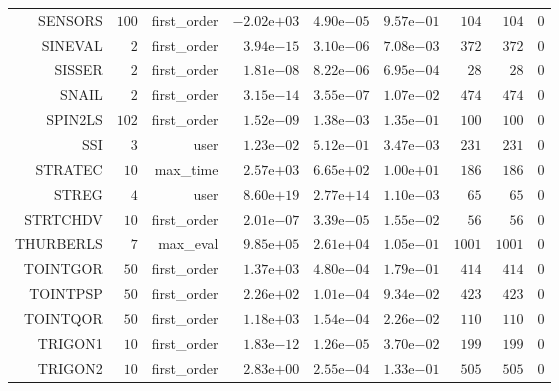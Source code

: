 \begin{longtable}{rrrrrrrrr}
SENSORS & \(   100\) & first\_order & \(-2.02\)e\(+03\) & \( 4.90\)e\(-05\) & \( 9.57\)e\(-01\) & \(   104\) & \(   104\) & \(     0\) \\
SINEVAL & \(     2\) & first\_order & \( 3.94\)e\(-15\) & \( 3.10\)e\(-06\) & \( 7.08\)e\(-03\) & \(   372\) & \(   372\) & \(     0\) \\
SISSER & \(     2\) & first\_order & \( 1.81\)e\(-08\) & \( 8.22\)e\(-06\) & \( 6.95\)e\(-04\) & \(    28\) & \(    28\) & \(     0\) \\
SNAIL & \(     2\) & first\_order & \( 3.15\)e\(-14\) & \( 3.55\)e\(-07\) & \( 1.07\)e\(-02\) & \(   474\) & \(   474\) & \(     0\) \\
SPIN2LS & \(   102\) & first\_order & \( 1.52\)e\(-09\) & \( 1.38\)e\(-03\) & \( 1.35\)e\(-01\) & \(   100\) & \(   100\) & \(     0\) \\
SSI & \(     3\) & user & \( 1.23\)e\(-02\) & \( 5.12\)e\(-01\) & \( 3.47\)e\(-03\) & \(   231\) & \(   231\) & \(     0\) \\
STRATEC & \(    10\) & max\_time & \( 2.57\)e\(+03\) & \( 6.65\)e\(+02\) & \( 1.00\)e\(+01\) & \(   186\) & \(   186\) & \(     0\) \\
STREG & \(     4\) & user & \( 8.60\)e\(+19\) & \( 2.77\)e\(+14\) & \( 1.10\)e\(-03\) & \(    65\) & \(    65\) & \(     0\) \\
STRTCHDV & \(    10\) & first\_order & \( 2.01\)e\(-07\) & \( 3.39\)e\(-05\) & \( 1.55\)e\(-02\) & \(    56\) & \(    56\) & \(     0\) \\
THURBERLS & \(     7\) & max\_eval & \( 9.85\)e\(+05\) & \( 2.61\)e\(+04\) & \( 1.05\)e\(-01\) & \(  1001\) & \(  1001\) & \(     0\) \\
TOINTGOR & \(    50\) & first\_order & \( 1.37\)e\(+03\) & \( 4.80\)e\(-04\) & \( 1.79\)e\(-01\) & \(   414\) & \(   414\) & \(     0\) \\
TOINTPSP & \(    50\) & first\_order & \( 2.26\)e\(+02\) & \( 1.01\)e\(-04\) & \( 9.34\)e\(-02\) & \(   423\) & \(   423\) & \(     0\) \\
TOINTQOR & \(    50\) & first\_order & \( 1.18\)e\(+03\) & \( 1.54\)e\(-04\) & \( 2.26\)e\(-02\) & \(   110\) & \(   110\) & \(     0\) \\
TRIGON1 & \(    10\) & first\_order & \( 1.83\)e\(-12\) & \( 1.26\)e\(-05\) & \( 3.70\)e\(-02\) & \(   199\) & \(   199\) & \(     0\) \\
TRIGON2 & \(    10\) & first\_order & \( 2.83\)e\(+00\) & \( 2.55\)e\(-04\) & \( 1.33\)e\(-01\) & \(   505\) & \(   505\) & \(     0\) \\

\end{longtable}

